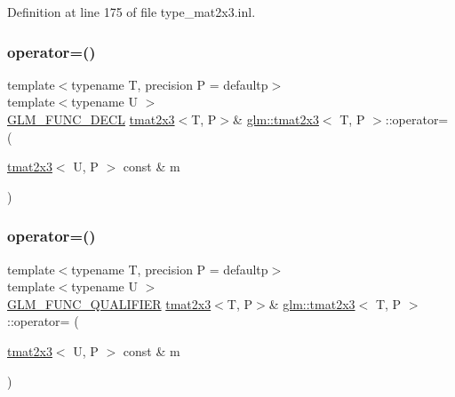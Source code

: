 Definition at line 175 of file type\+\_\+mat2x3.\+inl.

\mbox{\label{structglm_1_1tmat2x3_afaeb9829210555e86d1bce194f4f57c2}} 
\subsubsection{\texorpdfstring{operator=()}{operator=()}\hspace{0.1cm}{\footnotesize\ttfamily [2/3]}}
{\footnotesize\ttfamily template$<$typename T, precision P = defaultp$>$ \\
template$<$typename U $>$ \\
\mbox{\hyperlink{setup_8hpp_ab2d052de21a70539923e9bcbf6e83a51}{G\+L\+M\+\_\+\+F\+U\+N\+C\+\_\+\+D\+E\+CL}} \mbox{\hyperlink{structglm_1_1tmat2x3}{tmat2x3}}$<$T, P$>$\& \mbox{\hyperlink{structglm_1_1tmat2x3}{glm\+::tmat2x3}}$<$ T, P $>$\+::operator= (\begin{DoxyParamCaption}\item[{\mbox{\hyperlink{structglm_1_1tmat2x3}{tmat2x3}}$<$ U, P $>$ const \&}]{m }\end{DoxyParamCaption})}

\mbox{\label{structglm_1_1tmat2x3_a864869c76356750495b6d4172c8d84a3}} 
\subsubsection{\texorpdfstring{operator=()}{operator=()}\hspace{0.1cm}{\footnotesize\ttfamily [3/3]}}
{\footnotesize\ttfamily template$<$typename T, precision P = defaultp$>$ \\
template$<$typename U $>$ \\
\mbox{\hyperlink{setup_8hpp_a33fdea6f91c5f834105f7415e2a64407}{G\+L\+M\+\_\+\+F\+U\+N\+C\+\_\+\+Q\+U\+A\+L\+I\+F\+I\+ER}} \mbox{\hyperlink{structglm_1_1tmat2x3}{tmat2x3}}$<$T, P$>$\& \mbox{\hyperlink{structglm_1_1tmat2x3}{glm\+::tmat2x3}}$<$ T, P $>$\+::operator= (\begin{DoxyParamCaption}\item[{\mbox{\hyperlink{structglm_1_1tmat2x3}{tmat2x3}}$<$ U, P $>$ const \&}]{m }\end{DoxyParamCaption})}



